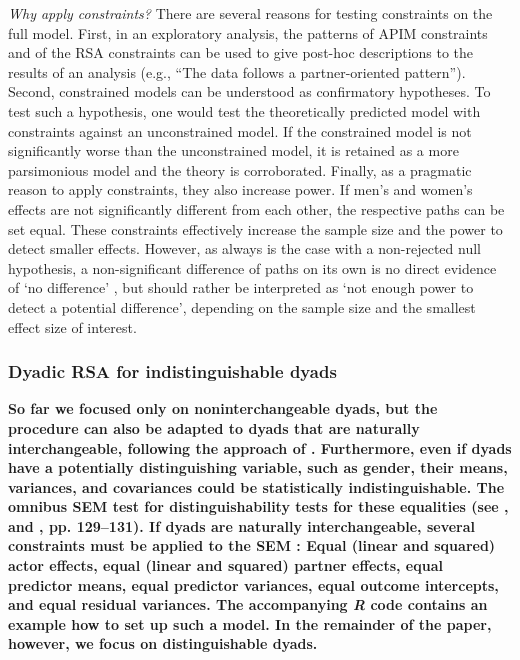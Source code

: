 \documentclass[jou,a4paper,draftfirst]{apa6}
\newcommand{\added}[1]{\textcolor{colour_added}{\bf{#1}}}
\begin{document}
\emph{Why apply constraints?}
There are several reasons for testing constraints on the full model. First, in an exploratory analysis, the patterns of APIM constraints and of the RSA constraints can be used to give post-hoc descriptions to the results of an analysis (e.g., ``The data follows a partner-oriented pattern''). Second, constrained models can be understood as confirmatory hypotheses. To test such a hypothesis, one would test the theoretically predicted model with constraints against an unconstrained model. If the constrained model is not significantly worse than the unconstrained model, it is retained as a more parsimonious model and the theory is corroborated. Finally, as a pragmatic reason to apply constraints, they also increase power. If men's and women's effects are not significantly different from each other, the respective paths can be set equal. These constraints effectively increase the sample size and the power to detect smaller effects. However, as always is the case with a non-rejected null hypothesis, a non-significant difference of paths on its own is no direct evidence of `no difference' \parencite[e.g.,][]{goodman_dirty_2008}, but should rather be interpreted as `not enough power to detect a potential difference', depending on the sample size and the smallest effect size of interest.

\subsubsection{Dyadic RSA for indistinguishable dyads}
\added{So far we focused only on noninterchangeable dyads, but the procedure can also be adapted to dyads that are naturally interchangeable, following the approach of \textcite{olsen_structural_2006}. Furthermore, even if dyads have a potentially distinguishing variable, such as gender, their means, variances, and covariances could be statistically indistinguishable. The omnibus SEM test for distinguishability tests for these equalities (see \nptextcite{gonzalez_correlational_1999}, and \nptextcite{kenny_dyadic_2006}, pp. 129--131). If dyads are naturally interchangeable, several constraints must be applied to the SEM \parencite{olsen_structural_2006}: Equal (linear and squared) actor effects, equal (linear and squared) partner effects, equal predictor means, equal predictor variances, equal outcome intercepts, and equal residual variances. The accompanying \textit{R} code contains an example how to set up such a model. In the remainder of the paper, however, we focus on distinguishable dyads.}
\end{document}
